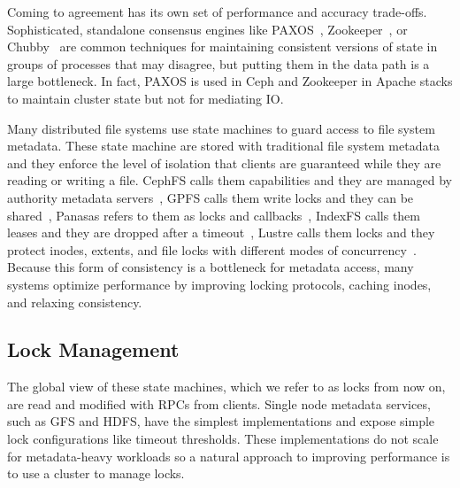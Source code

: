 Coming to agreement has its own set of performance and accuracy trade-offs.
Sophisticated, standalone consensus engines like
PAXOS~\cite{lamport_parttime_1998}, Zookeeper~\cite{hunt_zookeeper_2010}, or
Chubby~\cite{burrows_chubby_2006} are common techniques for maintaining
consistent versions of state in groups of processes that may disagree, but
putting them in the data path is a large bottleneck. In fact, PAXOS is used in
Ceph and Zookeeper in Apache stacks to maintain cluster state but not for
mediating IO.  

Many distributed file systems use state machines to guard access to file system
metadata.  These state machine are stored with traditional file system metadata
and they enforce the level of isolation that clients are guaranteed while they
are reading or writing a file. CephFS calls them capabilities and they are
managed by authority metadata servers~\cite{}, GPFS calls them write locks and
they can be shared~\cite{}, Panasas refers to them as locks and
callbacks~\cite{}, IndexFS calls them leases and they are dropped after a
timeout~\cite{}, Lustre calls them locks and they protect inodes, extents, and
file locks with different modes of concurrency~\cite{wang:tech09-lustre}.
Because this form of consistency is a bottleneck for metadata access, many
systems optimize performance by improving locking protocols, caching inodes,
and relaxing consistency.

\subsection{Lock Management}

The global view of these state machines, which we refer to as locks from now
on, are read and modified with RPCs from clients.  Single node metadata
services, such as GFS and HDFS, have the simplest implementations and expose
simple lock configurations like timeout thresholds.  These implementations do
not scale for metadata-heavy workloads so a natural approach to improving
performance is to use a cluster to manage locks.

